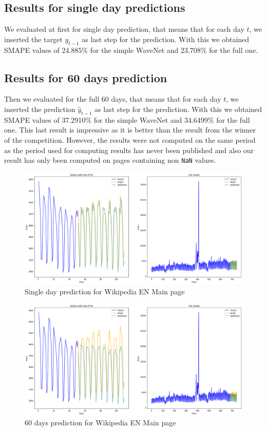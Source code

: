 \documentclass[11pt]{article}
\begin{document}
    \subsection{Results for single day predictions}
    We evaluated at first for single day prediction, that means that for each day $t$, we inserted the target $y_{t-1}$ as last step for the prediction. With this we obtained SMAPE values of 24.885\% for the simple WaveNet and 23.708\% for the full one.
    \subsection{Results for 60 days prediction}
    Then we evaluated for the full 60 days, that means that for each day $t$, we inserted the prediction $\hat{y}_{t-1}$ as last step for the prediction. With this we obtained SMAPE values of 37.2910\% for the simple WaveNet and 34.6499\% for the full one. This last result is impressive as it is better than the result from the winner of the competition. However, the results were not computed on the same period as the period used for computing results has never been published and also our result has only been computed on pages containing non \verb+NaN+ values.
    \begin{figure}[H]
        \centering
        \includegraphics[width=\textwidth]{prediction_single.png}
        \caption{Single day prediction for Wikipedia EN Main page}
    \end{figure}
    \begin{figure}[H]
        \centering
        \includegraphics[width=\textwidth]{prediction.png}
        \caption{60 days prediction for Wikipedia EN Main page}
    \end{figure}
    \newpage
\end{document}
